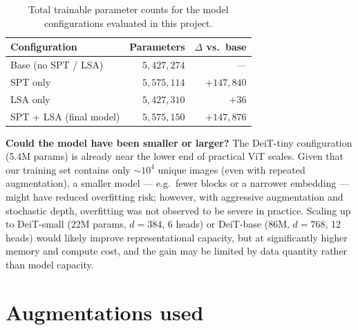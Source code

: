 \documentclass[11pt]{article}
\begin{document}
\begin{table}[H]
\centering
\small
\begin{tabular}{lrr}
\toprule
\textbf{Configuration} & \textbf{Parameters} & \textbf{$\Delta$ vs.\ base} \\
\midrule
Base (no SPT / LSA) & $5{,}427{,}274$ & --- \\
SPT only & $5{,}575{,}114$ & $+147{,}840$ \\
LSA only & $5{,}427{,}310$ & $+36$ \\
SPT + LSA (final model) & $5{,}575{,}150$ & $+147{,}876$ \\
\bottomrule
\end{tabular}
\caption{Total trainable parameter counts for the model configurations evaluated in this project.}
\label{tab:variant-params}
\end{table}

\textbf{Could the model have been smaller or larger?} The DeiT-tiny configuration (5.4M params) is already near the lower end of practical ViT scales. Given that our training set contains only $\sim 10^4$ unique images (even with repeated augmentation), a smaller model — e.g.\ fewer blocks or a narrower embedding — might have reduced overfitting risk; however, with aggressive augmentation and stochastic depth, overfitting was not observed to be severe in practice. Scaling up to DeiT-small (22M params, $d=384$, 6 heads) or DeiT-base (86M, $d=768$, 12 heads) would likely improve representational capacity, but at significantly higher memory and compute cost, and the gain may be limited by data quantity rather than model capacity.

\newpage
\appendix
\section{Augmentations used}
\end{document}
